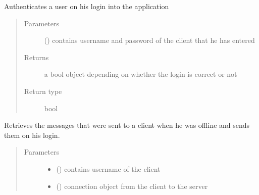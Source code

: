 \documentclass[letterpaper,10pt,english]{sphinxmanual}
\begin{document}
\begin{fulllineitems}
\label{\detokenize{server:server.loginpage}}
Authenticates a user on his login into the application
\begin{quote}\begin{description}
\item[{Parameters}] \leavevmode
{} () \textendash{} contains username and password of the client that he has entered

\item[{Returns}] \leavevmode
a bool object depending on whether the login is correct or not

\item[{Return type}] \leavevmode
bool

\end{description}\end{quote}

\end{fulllineitems}


\begin{fulllineitems}
\label{\detokenize{server:server.message_retrieval}}
Retrieves the messages that were sent to a client when he was offline and sends them on his login.
\begin{quote}\begin{description}
\item[{Parameters}] \leavevmode\begin{itemize}
\item {} 
 () \textendash{} contains username of the client

\item {} 
 () \textendash{} connection object from the client to the server

\end{itemize}

\end{description}\end{quote}

\end{fulllineitems}
\end{document}
